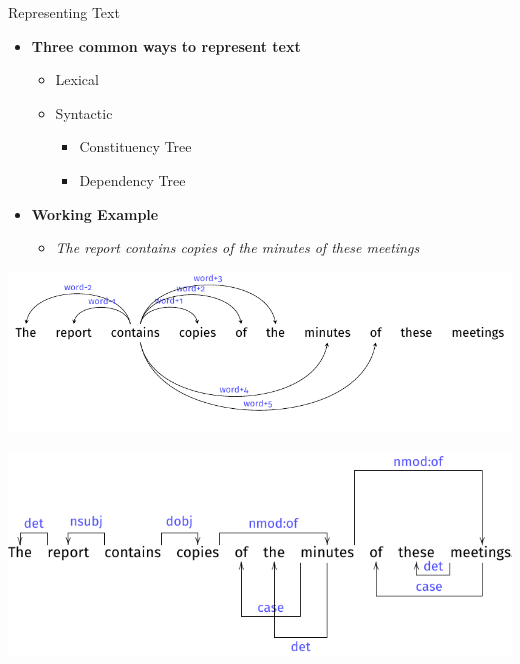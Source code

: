 \documentclass[10pt,xcolor=table]{beamer}
\begin{document}
\begin{frame}{Representing Text}

\begin{itemize}[<+- | alert@+>]
	\item \textbf{Three common ways to represent text}
	\begin{itemize}
		\item Lexical
		\item Syntactic
		\begin{itemize}
				\item Constituency Tree
				\item Dependency Tree
		\end{itemize}
	\end{itemize}
	\item \textbf{Working Example}
	\begin{itemize}
		\item[] \textit{The report contains copies of the minutes of these meetings}
	\end{itemize}
\end{itemize}

\begin{overprint}
  				

	  \centering	  
      \includegraphics[width=.8\linewidth]{img/tree/lexical_tree.pdf}
  	  
  	  \centering
      \includegraphics[width=.8\linewidth]{img/tree/dep_tree.pdf}
	  

\end{overprint}
\end{frame}
\end{document}

